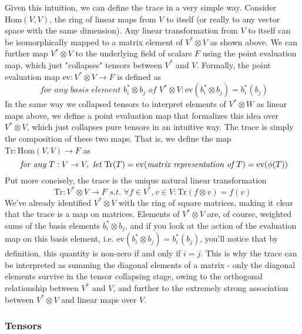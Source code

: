 \documentclass{article}
\newcommand{\n}{\leavevmode \newline}
\newcommand{\Hom}{\text{Hom}}
\begin{document}
\n
Given this intuition, we can define the trace in a very simple way. Consider $ \Hom(V, V) $, the ring of linear maps from $ V $ to itself (or really to any vector space with the same dimension). Any linear transformation from $ V $ to itself can be isomorphically mapped to a matrix element of $ V^* \otimes V $ as shown above. We can further map $ V^* \otimes V $ to the underlying field of scalars $ F $ using the point evaluation map, which just "collapses" tensors between $ V^* $ and $ V $. Formally, the point evaluation map $ \text{ev}: V^* \otimes V \rightarrow F $ is defined as
    $$ \textit{ for any basis element } b_i^* \otimes b_j \textit{ of } V^* \otimes V: \text{ev}(b_i^* \otimes b_j) = b_i^*(b_j) $$
In the same way we collapsed tensors to interpret elements of $ V^* \otimes W $ as linear maps above, we define a point evaluation map that formalizes this idea over $ V^* \otimes V $, which just collapses pure tensors in an intuitive way. The trace is simply the composition of these two maps. That is, we define the map $ \text{Tr}: \Hom(V, V) \rightarrow F $ as
    $$ \textit{ for any } T: V \rightarrow V, \textit{ let } \text{Tr}(T) = \text{ev}(\textit{matrix representation of $ T $}) = \text{ev}(\phi(T)) $$
Put more concisely, the trace is the unique natural linear transformation
    $$ \text{Tr}: V^* \otimes V \rightarrow F \textit{ s.t. } \forall f \in V^*, v \in V: \text{Tr}(f \otimes v) = f(v) $$
We've already identified $ V^* \otimes V $ with the ring of square matrices, making it clear that the trace is a map on matrices. Elements of $ V^* \otimes V $ are, of course, weighted sums of the basis elements $ b_i^* \otimes b_j $, and if you look at the action of the evaluation map on this basis element, i.e. $ \text{ev}(b_i^* \otimes b_j) = b_i^*(b_j) $, you'll notice that by definition, this quantity is non-zero if and only if $ i = j $. This is why the trace can be interpreted as summing the diagonal elements of a matrix - only the diagonal elements survive in the tensor collapsing stage, owing to the orthogonal relationship between $ V^* $ and $ V $, and further to the extremely strong association between $ V^* \otimes V $ and linear maps over $ V $.

\subsubsection{Tensors}
\end{document}
